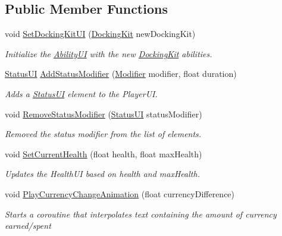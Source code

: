 \subsection*{Public Member Functions}
\begin{DoxyCompactItemize}
\item 
void \hyperlink{class_player_u_i_handler_abac7fc9da80f3f52602e789bf7d7d786}{Set\+Docking\+Kit\+UI} (\hyperlink{class_docking_kit}{Docking\+Kit} new\+Docking\+Kit)
\begin{DoxyCompactList}\small\item\em Initialize the \hyperlink{class_ability_u_i}{Ability\+UI} with the new \hyperlink{class_docking_kit}{Docking\+Kit} abilities. \end{DoxyCompactList}\item 
\hyperlink{class_status_u_i}{Status\+UI} \hyperlink{class_player_u_i_handler_a76e0a2223390a5578cd6c885f8ff9e1c}{Add\+Status\+Modifier} (\hyperlink{class_modifier}{Modifier} modifier, float duration)
\begin{DoxyCompactList}\small\item\em Adds a \hyperlink{class_status_u_i}{Status\+UI} element to the Player\+UI. \end{DoxyCompactList}\item 
void \hyperlink{class_player_u_i_handler_a0c18f57891bb979fe8377af65c6c4729}{Remove\+Status\+Modifier} (\hyperlink{class_status_u_i}{Status\+UI} status\+Modifier)
\begin{DoxyCompactList}\small\item\em Removed the status modifier from the list of elements. \end{DoxyCompactList}\item 
void \hyperlink{class_player_u_i_handler_ae527bfe70834ce8fe459d956f25e1607}{Set\+Current\+Health} (float health, float max\+Health)
\begin{DoxyCompactList}\small\item\em Updates the Health\+UI based on health and max\+Health. \end{DoxyCompactList}\item 
void \hyperlink{class_player_u_i_handler_a86672aa016a9bdec4b8eebd3ece87f87}{Play\+Currency\+Change\+Animation} (float currency\+Difference)
\begin{DoxyCompactList}\small\item\em Starts a coroutine that interpolates text containing the amount of currency earned/spent \end{DoxyCompactList}\end{DoxyCompactItemize}

